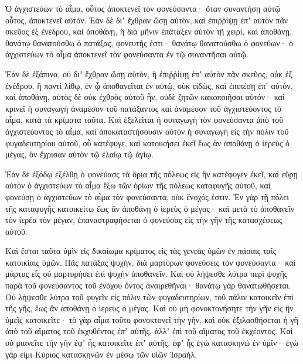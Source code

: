 {\par }{\PP {}Ὁ ἀγχιστεύων τὸ αἷμα, οὗτος ἀποκτενεῖ τὸν φονεύσαντα· ὅταν συναντήσῃ αὐτῷ οὗτος, ἀποκτενεῖ αὐτόν.
Ἐὰν δὲ διʼ ἔχθραν ὤσῃ αὐτὸν, καὶ ἐπιῤῥίψῃ ἐπʼ αὐτὸν πᾶν σκεῦος ἐξ ἐνέδρου, καὶ ἀποθάνῃ,
ἢ διὰ μῆνιν ἐπάταξεν αὐτὸν τῇ χειρί, καὶ ἀποθάνῃ, θανάτῳ θανατούσθω ὁ πατάξας, φονευτής ἐστι· θανάτῳ θανατούσθω ὁ φονεύων· ὁ ἀγχιστεύων τὸ αἷμα ἀποκτενεῖ τὸν φονεύσαντα ἐν τῷ συναντῆσαι αὐτῷ.
\par }{\PP {}Ἐὰν δὲ ἐξάπινα, οὐ διʼ ἔχθραν ὤσῃ αὐτὸν, ἢ ἐπιῤῥίψῃ ἐπʼ αὐτὸν πᾶν σκεῦος, οὐκ ἐξ ἐνέδρου,
ἢ παντὶ λίθῳ, ἐν ᾧ ἀποθανεῖται ἐν αὐτῷ, οὐκ εἰδὼς, καὶ ἐπιπέσῃ ἐπʼ αὐτὸν, καὶ ἀποθάνῃ, αὐτὸς δὲ οὐκ ἐχθρὸς αὐτοῦ ἦν, οὐδὲ ζητῶν κακοποιῆσαι αὐτόν·
καὶ κρινεῖ ἡ συναγωγὴ ἀναμέσον τοῦ πατάξαντος καὶ ἀναμέσον τοῦ ἀγχιστεύοντος τὸ αἷμα, κατὰ τὰ κρίματα ταῦτα.
Καὶ ἐξελεῖται ἡ συναγωγὴ τὸν φονεύσαντα ἀπὸ τοῦ ἀγχιστεύοντος τὸ αἷμα, καὶ ἀποκαταστήσουσιν αὐτὸν ἡ συναγωγὴ εἰς τὴν πόλιν τοῦ φυγαδευτηρίου αὐτοῦ, οὗ κατέφυγε, καὶ κατοικήσει ἐκεῖ ἕως ἂν ἀποθάνῃ ὁ ἱερεὺς ὁ μέγας, ὃν ἔχρισαν αὐτὸν τῷ ἐλαίῳ τῷ ἁγίῳ.
\par }{\PP {}Ἐὰν δὲ ἐξόδῳ ἐξέλθῃ ὁ φονεύασς τὰ ὅρια τῆς πόλεως εἰς ἣν κατέφυγεν ἐκεῖ,
καὶ εὕρῃ αὐτὸν ὁ ἀγχιστεύων τὸ αἷμα ἔξω τῶν ὁρίων τῆς πόλεως καταφυγῆς αὐτοῦ, καὶ φονεύσῃ ὁ ἀγχιστεύων τὸ αἷμα τὸν φονεύσαντα, οὐκ ἔνοχός ἐστιν.
Ἐν γὰρ τῇ πόλει τῆς καταφυγῆς κατοικείτω ἕως ἂν ἀποθάνῃ ὁ ἱερεὺς ὁ μέγας· καὶ μετὰ τὸ ἀποθανεῖν τὸν ἱερέα τὸν μέγαν, ἐπαναστραφήσεται ὁ φονεύσας εἰς τὴν γῆν τῆς κατασχέσεως αὐτοῦ.
\par }{\PP {}Καὶ ἔσται ταῦτα ὑμῖν εἰς δικαίωμα κρίματος εἰς τὰς γενεὰς ὑμῶν ἐν πάσαις ταῖς κατοικίαις ὑμῶν.
Πᾶς πατάξας ψυχήν, διὰ μαρτύρων φονεύσεις τὸν φονεύσαντα· καὶ μάρτυς εἷς οὐ μαρτυρήσει ἐπὶ ψυχὴν ἀποθανεῖν.
Καὶ οὐ λήψεσθε λύτρα περὶ ψυχῆς παρὰ τοῦ φονεύσαντος τοῦ ἐνόχου ὄντος ἀναιρεθῆναι· θανάτῳ γὰρ θανατωθήσεται.
Οὐ λήψεσθε λύτρα τοῦ φυγεῖν εἰς πόλιν τῶν φυγαδευτηρίων, τοῦ πάλιν κατοικεῖν ἐπὶ τῆς γῆς, ἕως ἂν ἀποθάνῃ ὁ ἱερεὺς ὁ μέγας.
Καὶ οὐ μὴ φονοκτονήσητε τὴν γῆν εἰς ἣν ὑμεῖς κατοικεῖτε· τὸ γὰρ αἷμα τοῦτο φονοκτονεῖ τὴν γῆν, καὶ οὐκ ἐξιλασθήσεται ἡ γῆ ἀπὸ τοῦ αἵματος τοῦ ἐκχυθέντος ἐπʼ αὐτῆς, ἀλλʼ ἐπὶ τοῦ αἵματος τοῦ ἐκχέοντος.
Καὶ οὐ μιανεῖτε τὴν γῆν ἐφʼ ἧς κατοικεῖτε ἐπʼ αὐτῆς, ἐφʼ ἧς ἐγὼ κατασκηνώ ἐν ὑμῖν· ἐγὼ γάρ εἰμι Κύριος κατασκηνῶν ἐν μέσῳ τῶν υἱῶν Ἰσραήλ.

}

